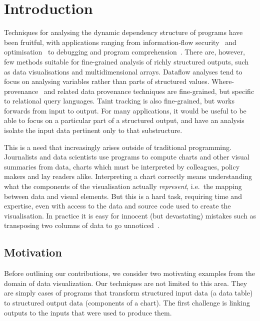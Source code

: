 \section{Introduction}

Techniques for analysing the dynamic dependency structure of programs have been fruitful, with applications ranging from information-flow security~\cite{sabelfeld03} and optimisation~\cite{kildall73} to debugging and program comprehension~\cite{weiser81,delucia96}. There are, however, few methods suitable for fine-grained analysis of richly structured outputs, such as data visualisations and multidimensional arrays. Dataflow analyses \cite{reps95} tend to focus on analysing variables rather than parts of structured values. Where-provenance~\cite{buneman01} and related data provenance techniques are fine-grained, but specific to relational query languages. Taint tracking \cite{newsome05} is also fine-grained, but works forwards from input to output. For many applications, it would be useful to be able to focus on a particular part of a structured output, and have an analysis isolate the input data pertinent only to that substructure.

This is a need that increasingly arises outside of traditional programming. Journalists and data scientists use programs to compute charts and other visual summaries from data, charts which must be interpreted by colleagues, policy makers and lay readers alike. Interpreting a chart correctly means understanding what the components of the visualisation actually \emph{represent}, i.e.~the mapping between data and visual elements. But this is a hard task, requiring time and expertise, even with access to the data and source code used to create the visualisation. In practice it is easy for innocent (but devastating) mistakes such as transposing two columns of data to go unnoticed~\cite{miller06}.


\subsection{Motivation}
Before outlining our contributions, we consider two motivating examples from the domain of data visualization. Our techniques are not limited to this area. They are simply cases of programs that transform structured input data (a data table) to structured output data (components of a chart). The first challenge is linking outputs to the inputs that were used to produce them.

